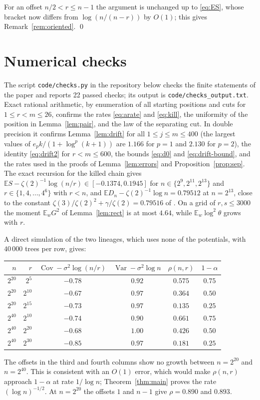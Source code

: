 \documentclass[11pt]{amsart}
\theoremstyle{remark}
\numberwithin{equation}{section}
\newcommand{\E}{\mathbb E}
\newcommand{\Var}{\operatorname{Var}}
\newcommand{\Cov}{\operatorname{Cov}}
\begin{document}
For an offset $n/2<r\le n-1$ the argument is unchanged up to \eqref{eq:ES}, whose bracket now differs from $\log(n/(n-r))$ by $O(1)$; this gives Remark~\ref{rem:oriented}. \qed

\section{Numerical checks}\label{sec:numerics}

The script \texttt{code/checks.py} in the repository below checks the finite statements of the paper and reports 22 passed checks; its output is \texttt{code/checks\_output.txt}. Exact rational arithmetic, by enumeration of all starting positions and cuts for $1\le r<m\le26$, confirms the rates \eqref{eq:arate} and \eqref{eq:kill}, the uniformity of the position in Lemma~\ref{lem:pair}, and the law of the separating cut. In double precision it confirms Lemma~\ref{lem:drift} for all $1\le j\le m\le400$ (the largest values of $e_pk/(1+\log^p(k+1))$ are $1.166$ for $p=1$ and $2.130$ for $p=2$), the identity \eqref{eq:drift2} for $r<m\le600$, the bounds \eqref{eq:d0} and \eqref{eq:drift-bound}, and the rates used in the proofs of Lemma~\ref{lem:errors} and Proposition~\ref{prop:sep}. The exact recursion for the killed chain gives $\E S-\zeta(2)^{-1}\log(n/r)\in[-0.1374,0.1945]$ for $n\in\{2^9,2^{11},2^{13}\}$ and $r\in\{1,4,\dots,4^6\}$ with $r<n$, and $\E D_n-\zeta(2)^{-1}\log n=0.79512$ at $n=2^{13}$, close to the constant $\zeta(3)/\zeta(2)^2+\gamma/\zeta(2)=0.79516$ of \cite{AJ4}. On a grid of $r,s\le3000$ the moment $\E_wG^2$ of Lemma~\ref{lem:rect} is at most $4.64$, while $\E_w\log^2\theta$ grows with $r$.

A direct simulation of the two lineages, which uses none of the potentials, with $40\,000$ trees per row, gives:
\begin{center}
\begin{tabular}{rrcccc}
\toprule
$n$ & $r$ & $\Cov-\sigma^2\log(n/r)$ & $\Var-\sigma^2\log n$ & $\rho(n,r)$ & $1-\alpha$\\
\midrule
$2^{20}$ & $2^{5}$ & $-0.78$ & $0.92$ & $0.575$ & $0.75$\\
$2^{20}$ & $2^{10}$ & $-0.67$ & $0.97$ & $0.364$ & $0.50$\\
$2^{20}$ & $2^{15}$ & $-0.73$ & $0.97$ & $0.135$ & $0.25$\\
$2^{40}$ & $2^{10}$ & $-0.74$ & $0.90$ & $0.661$ & $0.75$\\
$2^{40}$ & $2^{20}$ & $-0.68$ & $1.00$ & $0.426$ & $0.50$\\
$2^{40}$ & $2^{30}$ & $-0.85$ & $0.97$ & $0.181$ & $0.25$\\
\bottomrule
\end{tabular}
\end{center}
The offsets in the third and fourth columns show no growth between $n=2^{20}$ and $n=2^{40}$. This is consistent with an $O(1)$ error, which would make $\rho(n,r)$ approach $1-\alpha$ at rate $1/\log n$; Theorem~\ref{thm:main} proves the rate $(\log n)^{-1/2}$. At $n=2^{20}$ the offsets $1$ and $n-1$ give $\rho=0.890$ and $0.893$.
\end{document}
